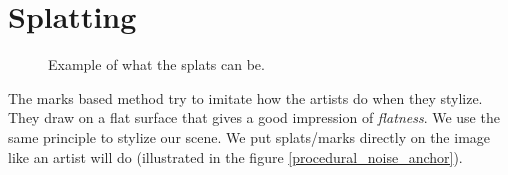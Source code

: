 \section{Splatting}

\begin{figure}[H]
    \begin{center}
    \end{center}
    \caption{Example of what the splats can be.}
    \label{splat_examples}
\end{figure}

The marks based method try to imitate how the artists do when they stylize. They draw on a flat surface that gives a good impression of \textit{flatness}. We use the same principle to stylize our scene. We put splats/marks directly on the image like an artist will do (illustrated in the figure \ref{procedural_noise_anchor}). \newline

